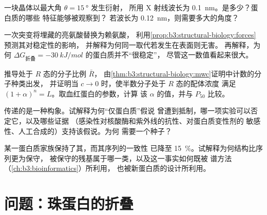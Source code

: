 \begin{exercise}[$\star\star$]\label{exo:b3:structural-biology:8}
一块晶体以最大角 $\theta = \qty{15}{\degree}$ 发生衍射，
所用 X 射线波长为 \qty{0.1}{nm}。是多少？蛋白质的哪些
特征能够被观察到？
若波长为 \qty{0.12}{nm}，则需要多大的角度？
\end{exercise}

\begin{exercise}[$\star\star$]\label{exo:b3:structural-biology:9}
一次突变将埋藏的亮氨酸替换为赖氨酸，
利用\cref{prop:b3:structural-biology:forces}预测其对稳定性的影响，
并解释为何同一取代若发生在表面则无害。
再解释，为何 $\Delta G_{\text{折叠}} =
\qty{-30}{kJ/mol}$ 的蛋白质并不“很稳定”，
尽管这一数值看起来很大。
\end{exercise}

\begin{exercise}[$\star\star\star$]\label{exo:b3:structural-biology:10}
推导处于 $R$ 态的分子比例 $\bar R$，
由\cref{thm:b3:structural-biology:mwc}证明中计数的分子种类出发，
并证明当 $c \to 0$ 时，使半数分子处于 $R$ 态的配体浓度
满足 $(1+\alpha)^{n} = L$。取血红蛋白的参数，计算
该 $\alpha$ 的值，并与 $P_{50}$ 比较。
\end{exercise}

\begin{exercise}[$\star\star\star$]\label{exo:b3:structural-biology:11}
传递的是一种构象。试解释为何“仅蛋白质”假说
曾遭到抵制，哪一项实验可以否定它，以及哪些证据
（感染性对核酸酶和紫外线的抗性、对蛋白质变性剂的
敏感性、人工合成的）支持该假说。为何
需要一个种子？
\end{exercise}

\begin{exercise}[$\star\star\star$]\label{exo:b3:structural-biology:12}
某一蛋白质家族保持了其，而其序列的一致性
已降至 \qty{15}{\%}。试解释为何结构比序列更为保守，
被保守的残基属于哪一类，以及这一事实如何既被
谱方法（\cref{ch:b3:bioinformatics}）所利用，
也被新蛋白质的设计所利用。
\end{exercise}

\section{问题：珠蛋白的折叠}

